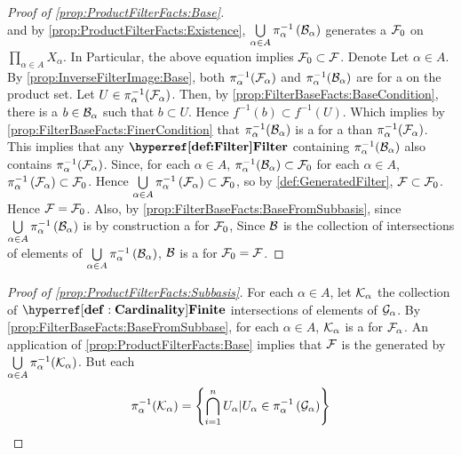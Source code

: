 \begin{prop}
\begin{proof}[Proof of \ref{prop:ProductFilterFacts:Base}]
\begin{equation}
    \end{equation}
    and by \ref{prop:ProductFilterFacts:Existence}, 
    $\bigcup\limits_{\alpha\in A} \pi_{\alpha}^{-1}\left( \mathcal{B}_\alpha\right)$ 
    generates a \Filter $\mathcal{F}_0$ on $\prod\limits_{\alpha \in A}X_\alpha$.
    In Particular, the above equation implies $\mathcal{F}_0 \subset \mathcal{F}$. 
    Denote 
    Let $\alpha \in A$. 
    By \ref{prop:InverseFilterImage:Base}, both 
    $\pi_\alpha^{-1}(\mathcal{F}_\alpha)$ and $\pi_{\alpha}^{-1}(\mathcal{B}_\alpha)$ are \FilterBases 
    for a \Filter on the product set. 
    Let $U \in \pi_\alpha^{-1}(\mathcal{F}_\alpha)$. 
    Then, by 
    \ref{prop:FilterBaseFacts:BaseCondition}, there is a $b \in \mathcal{B}_\alpha$ such that 
    $b \subset U$. Hence $f^{-1}(b) \subset f^{-1}(U)$.
    Which implies by \ref{prop:FilterBaseFacts:FinerCondition} that
    $\pi_\alpha^{-1}(\mathcal{B}_\alpha)$ is a \FilterBase for a \FinerFilter \Filter 
    than $\pi_{\alpha}^{-1}(\mathcal{F}_\alpha)$. 
    This implies that any $\Filter$ containing $\pi_{\alpha}^{-1}(\mathcal{B}_\alpha)$ also contains 
    $\pi_{\alpha}^{-1}(\mathcal{F}_\alpha)$. 
    Since, for each $\alpha \in A$, $\pi_{\alpha}^{-1}(\mathcal{B}_\alpha)\subset\mathcal{F}_0$
    for each $\alpha \in A$, $\pi_\alpha^{-1} \left( \mathcal{F}_\alpha\right) \subset \mathcal{F}_0$. 
    Hence $\bigcup\limits_{\alpha \in A}\pi_\alpha^{-1} \left( \mathcal{F}_\alpha\right) \subset \mathcal{F}_0$, 
    so by \ref{def:GeneratedFilter}, $\mathcal{F} \subset \mathcal{F}_0$. 
    Hence $\mathcal{F}=\mathcal{F}_0$. 
    Also, by \ref{prop:FilterBaseFacts:BaseFromSubbasis}, since 
    $\bigcup\limits_{\alpha \in A} \pi_{\alpha}^{-1}\left( \mathcal{B}_\alpha\right)$
    is by construction a \FilterSubbasis for $\mathcal{F}_0$, 
    Since $\mathcal{B}$ is the collection of \Finite intersections 
    of elements of $\bigcup\limits_{\alpha \in A} \pi_{\alpha}^{-1}\left( \mathcal{B}_\alpha\right)$,
    $\mathcal{B}$ is a \FilterBase for $\mathcal{F}_0=\mathcal{F}$. 
\end{proof}
\begin{proof}[Proof of \ref{prop:ProductFilterFacts:Subbasis}]
    For each $\alpha \in A$, let $\mathcal{K}_\alpha$ the collection
    of $\Finite$ intersections of elements of $\mathcal{G}_\alpha$. 
    By \ref{prop:FilterBaseFacts:BaseFromSubbase}, for each 
    $\alpha \in A$, $\mathcal{K}_\alpha$ is a \FilterBase for $\mathcal{F}_\alpha$. 
    An application of \ref{prop:ProductFilterFacts:Base} implies 
    that $\mathcal{F}$ is the \Filter generated by $\bigcup\limits_{\alpha \in A} \pi_{\alpha}^{-1}(\mathcal{K}_\alpha)$. 
    But each 
    \begin{equation*}
    \pi_{\alpha}^{-1}(\mathcal{K}_\alpha) =\left\{\bigcap\limits_{i=1}^n U_\alpha | U_\alpha \in \pi_{\alpha}^{-1}\left( \mathcal{G}_\alpha\right)\right\}
    \end{equation*}

\end{proof}
\end{prop}

